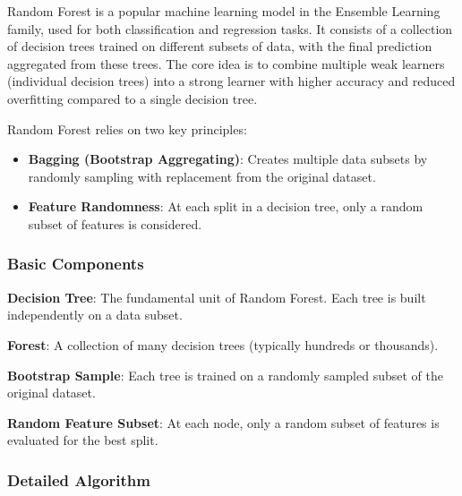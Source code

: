 Random Forest is a popular machine learning model in the Ensemble Learning family, used for both classification and regression tasks.
It consists of a collection of decision trees trained on different subsets of data, with the final prediction aggregated from these trees.
The core idea is to combine multiple weak learners (individual decision trees) into a strong learner with higher accuracy and reduced overfitting compared to a single decision tree.

Random Forest relies on two key principles:

\begin{itemize}
    \item \textbf{Bagging (Bootstrap Aggregating)}: Creates multiple data subsets by randomly sampling with replacement from the original dataset.
    \item \textbf{Feature Randomness}: At each split in a decision tree, only a random subset of features is considered.
\end{itemize}

\subsubsection{Basic Components}\text{}

\smallskip
\textbf{Decision Tree}: The fundamental unit of Random Forest.
Each tree is built independently on a data subset.

\textbf{Forest}: A collection of many decision trees (typically hundreds or thousands).

\textbf{Bootstrap Sample}: Each tree is trained on a randomly sampled subset of the original dataset.

\textbf{Random Feature Subset}: At each node, only a random subset of features is evaluated for the best split.

\smallskip
\subsubsection{Detailed Algorithm}\text{}

